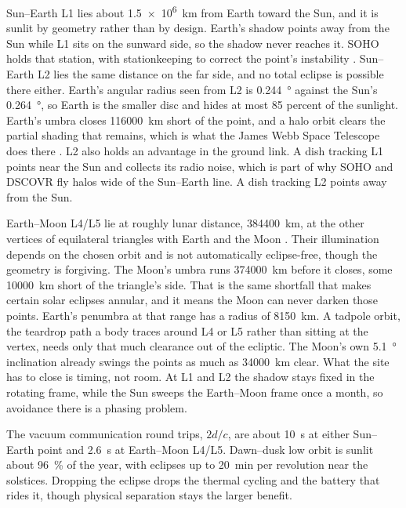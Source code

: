 \documentclass{article}
\begin{document}
Sun--Earth L1 lies about \SI{1.5e6}{\kilo\meter} from Earth toward the Sun, and it is sunlit by geometry rather than by design. Earth's shadow points away from the Sun while L1 sits on the sunward side, so the shadow never reaches it. SOHO holds that station, with stationkeeping to correct the point's instability \cite{nasa_lagrange_points,nasa_soho}. Sun--Earth L2 lies the same distance on the far side, and no total eclipse is possible there either. Earth's angular radius seen from L2 is \SI{0.244}{\degree} against the Sun's \SI{0.264}{\degree}, so Earth is the smaller disc and hides at most 85 percent of the sunlight. Earth's umbra closes \SI{116000}{\kilo\meter} short of the point, and a halo orbit clears the partial shading that remains, which is what the James Webb Space Telescope does there \cite{gardner2023jwst_mission}. L2 also holds an advantage in the ground link. A dish tracking L1 points near the Sun and collects its radio noise, which is part of why SOHO and DSCOVR fly halos wide of the Sun--Earth line. A dish tracking L2 points away from the Sun.

Earth--Moon L4/L5 lie at roughly lunar distance, \SI{384400}{\kilo\meter}, at the other vertices of equilateral triangles with Earth and the Moon \cite{nasa_lagrange_points,nasa_moon_facts}. Their illumination depends on the chosen orbit and is not automatically eclipse-free, though the geometry is forgiving. The Moon's umbra runs \SI{374000}{\kilo\meter} before it closes, some \SI{10000}{\kilo\meter} short of the triangle's side. That is the same shortfall that makes certain solar eclipses annular, and it means the Moon can never darken those points. Earth's penumbra at that range has a radius of \SI{8150}{\kilo\meter}. A tadpole orbit, the teardrop path a body traces around L4 or L5 rather than sitting at the vertex, needs only that much clearance out of the ecliptic. The Moon's own \SI{5.1}{\degree} inclination already swings the points as much as \SI{34000}{\kilo\meter} clear. What the site has to close is timing, not room. At L1 and L2 the shadow stays fixed in the rotating frame, while the Sun sweeps the Earth--Moon frame once a month, so avoidance there is a phasing problem.

The vacuum communication round trips, $2d/c$, are about \SI{10}{\second} at either Sun--Earth point and \SI{2.6}{\second} at Earth--Moon L4/L5. Dawn--dusk low orbit is sunlit about \SI{96}{\percent} of the year, with eclipses up to \SI{20}{\minute} per revolution near the solstices. Dropping the eclipse drops the thermal cycling and the battery that rides it, though physical separation stays the larger benefit.
\end{document}
